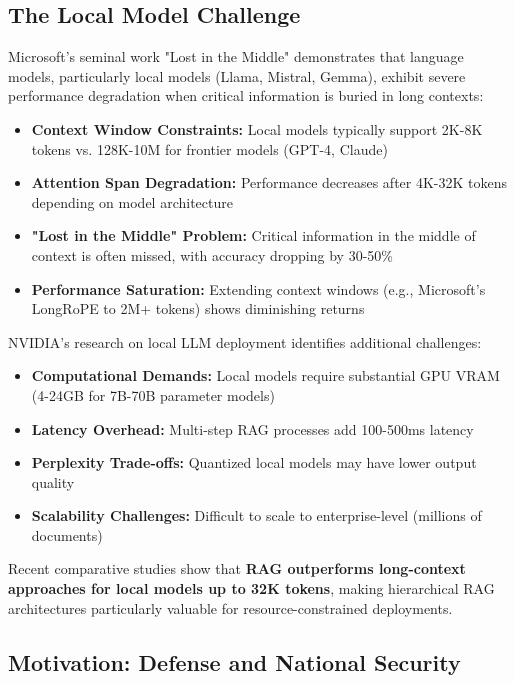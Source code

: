 \documentclass[11pt]{article}
\begin{document}
\subsection{The Local Model Challenge}

Microsoft's seminal work "Lost in the Middle" \cite{liu2023lost} demonstrates that language models, particularly local models (Llama, Mistral, Gemma), exhibit severe performance degradation when critical information is buried in long contexts:

\begin{itemize}
    \item \textbf{Context Window Constraints:} Local models typically support 2K-8K tokens vs. 128K-10M for frontier models (GPT-4, Claude)
    \item \textbf{Attention Span Degradation:} Performance decreases after 4K-32K tokens depending on model architecture
    \item \textbf{"Lost in the Middle" Problem:} Critical information in the middle of context is often missed, with accuracy dropping by 30-50\%
    \item \textbf{Performance Saturation:} Extending context windows (e.g., Microsoft's LongRoPE to 2M+ tokens) shows diminishing returns
\end{itemize}

NVIDIA's research on local LLM deployment \cite{nvidia2024rag} identifies additional challenges:

\begin{itemize}
    \item \textbf{Computational Demands:} Local models require substantial GPU VRAM (4-24GB for 7B-70B parameter models)
    \item \textbf{Latency Overhead:} Multi-step RAG processes add 100-500ms latency
    \item \textbf{Perplexity Trade-offs:} Quantized local models may have lower output quality
    \item \textbf{Scalability Challenges:} Difficult to scale to enterprise-level (millions of documents)
\end{itemize}

Recent comparative studies \cite{arxiv2024longcontext} show that \textbf{RAG outperforms long-context approaches for local models up to 32K tokens}, making hierarchical RAG architectures particularly valuable for resource-constrained deployments.

\subsection{Motivation: Defense and National Security}
\end{document}
